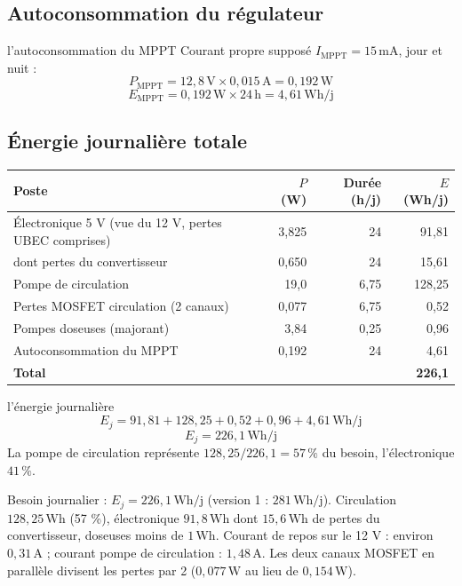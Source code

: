 \documentclass[11pt,a4paper]{article}
\newcommand{\U}[1]{\,\mathrm{#1}}
\begin{document}
\subsection{Autoconsommation du régulateur}

\begin{calcul}{l'autoconsommation du MPPT}
Courant propre supposé $I_{\text{MPPT}} = 15\U{mA}$, jour et nuit :
\[
P_{\text{MPPT}} = 12{,}8\U{V} \times 0{,}015\U{A} = 0{,}192\U{W}
\]
\[
E_{\text{MPPT}} = 0{,}192\U{W} \times 24\U{h} = 4{,}61\U{Wh/j}
\]
\end{calcul}

\subsection{Énergie journalière totale}

\begin{center}
\begin{tabular}{l r r r}
\toprule
\textbf{Poste} & \textbf{$P$ (W)} & \textbf{Durée (h/j)} & \textbf{$E$ (Wh/j)} \\
\midrule
Électronique 5 V (vue du 12 V, pertes UBEC comprises) & 3,825 & 24 & 91,81 \\
\quad dont pertes du convertisseur & 0,650 & 24 & 15,61 \\
Pompe de circulation & 19,0 & 6,75 & 128,25 \\
Pertes MOSFET circulation (2 canaux) & 0,077 & 6,75 & 0,52 \\
Pompes doseuses (majorant) & 3,84 & 0,25 & 0,96 \\
Autoconsommation du MPPT & 0,192 & 24 & 4,61 \\
\midrule
\textbf{Total} & & & \textbf{226,1} \\
\bottomrule
\end{tabular}
\end{center}

\begin{calcul}{l'énergie journalière}
\[
E_j = 91{,}81 + 128{,}25 + 0{,}52 + 0{,}96 + 4{,}61\U{Wh/j}
\]
\[
E_j = 226{,}1\U{Wh/j}
\]
La pompe de circulation représente $128{,}25 / 226{,}1 = 57\U{\%}$ du besoin, l'électronique $41\U{\%}$.
\end{calcul}

\begin{resume}
Besoin journalier : $E_j = 226{,}1\U{Wh/j}$ (version 1 : $281\U{Wh/j}$). Circulation $128{,}25\U{Wh}$ (57 \%), électronique $91{,}8\U{Wh}$ dont $15{,}6\U{Wh}$ de pertes du convertisseur, doseuses moins de $1\U{Wh}$. Courant de repos sur le 12 V : environ $0{,}31\U{A}$ ; courant pompe de circulation : $1{,}48\U{A}$. Les deux canaux MOSFET en parallèle divisent les pertes par 2 ($0{,}077\U{W}$ au lieu de $0{,}154\U{W}$).
\end{resume}
\end{document}
